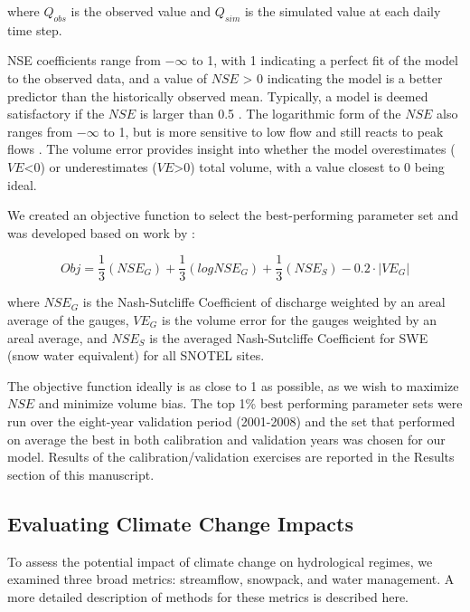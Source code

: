 \documentclass[water,article,submit,moreauthors,pdftex,10pt,a4paper]{mdpi}
\theoremstyle{mdpi}
\newcounter{thm}
\newcounter{ex}
\newcounter{re}
\theoremstyle{mdpidefinition}
\begin{document}
where $Q_{obs}$ is the observed value and $Q_{sim}$ is the simulated value at each daily time step.

NSE coefficients range from $-\infty$ to 1, with 1 indicating a perfect fit of the model to the observed data, and a value of $NSE$ > 0 indicating the model is a better predictor than the historically observed mean. Typically, a model is deemed satisfactory if the $NSE$ is larger than 0.5 \citep{NMoriasi:2007tj}. The logarithmic form of the $NSE$ also ranges from $-\infty$ to 1, but is more sensitive to low flow and still reacts to peak flows \citep{krause:hal-00296842}. The volume error provides insight into whether the model overestimates ($VE$<0) or underestimates ($VE$>0) total volume, with a value closest to 0 being ideal.

We created an objective function to select the best-performing parameter set and was developed based on work by \citep{Inouye:2014ws}:

\begin{equation}
Obj = \frac{1}{3}\left(NSE_G\right) + \frac{1}{3}\left(logNSE_G\right) + \frac{1}{3}\left(NSE_S\right) - 0.2\cdot\left|VE_G\right|
\end{equation}

where $NSE_G$ is the Nash-Sutcliffe Coefficient of discharge weighted by an areal average of the gauges, $VE_G$  is the volume error for the gauges weighted by an areal average, and $NSE_S$ is the averaged Nash-Sutcliffe Coefficient for SWE (snow water equivalent) for all SNOTEL sites. 

The objective function ideally is as close to 1 as possible, as we wish to maximize $NSE$ and minimize volume bias. The top 1\% best performing parameter sets were run over the eight-year validation period (2001-2008) and the set that performed on average the best in both calibration and validation years was chosen for our model. Results of the calibration/validation exercises are reported in the Results section of this manuscript.

\subsection{Evaluating Climate Change Impacts}

To assess the potential impact of climate change on hydrological regimes, we examined three broad metrics: streamflow, snowpack, and water management. A more detailed description of methods for these metrics is described here.
\end{document}
